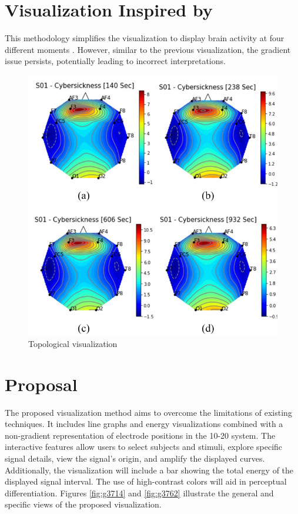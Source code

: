 \documentclass[format=acmtog]{acmart}
\begin{document}
	\section{Visualization Inspired by \cite{8937083}}
	This methodology simplifies the visualization to display brain activity at four different moments \cite{8937083}. However, similar to the previous visualization, the gradient issue persists, potentially leading to incorrect interpretations.
	
	\begin{figure}
		\centering
		\includegraphics[width=\linewidth]{../presentation/images/visu02}
		\caption{Topological visualization}
		\label{fig:visu02}
	\end{figure}
	
	\section{Proposal}
	The proposed visualization method aims to overcome the limitations of existing techniques. It includes line graphs and energy visualizations combined with a non-gradient representation of electrode positions in the 10-20 system. The interactive features allow users to select subjects and stimuli, explore specific signal details, view the signal's origin, and amplify the displayed curves. Additionally, the visualization will include a bar showing the total energy of the displayed signal interval. The use of high-contrast colors will aid in perceptual differentiation. Figures \ref{fig:g3714} and \ref{fig:g3762} illustrate the general and specific views of the proposed visualization.
	
\end{document}
